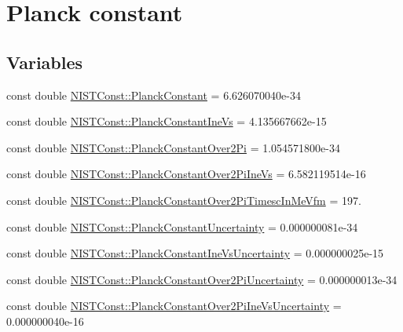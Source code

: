 \hypertarget{group___n_i_s_t_const-_planck_constant}{}\section{Planck constant}
\label{group___n_i_s_t_const-_planck_constant}
\subsection*{Variables}
\begin{DoxyCompactItemize}
\item 
const double \hyperlink{group___n_i_s_t_const-_planck_constant_ga6caa482b17de2f08f423eff1a521b0d7}{N\+I\+S\+T\+Const\+::\+Planck\+Constant} = 6.\+626070040e-\/34
\item 
const double \hyperlink{group___n_i_s_t_const-_planck_constant_ga4587d736f45c35788453a9509eaee7f2}{N\+I\+S\+T\+Const\+::\+Planck\+Constant\+Ine\+Vs} = 4.\+135667662e-\/15
\item 
const double \hyperlink{group___n_i_s_t_const-_planck_constant_ga9b3484c3c80e4a97206c7945b0db539b}{N\+I\+S\+T\+Const\+::\+Planck\+Constant\+Over2\+Pi} = 1.\+054571800e-\/34
\item 
const double \hyperlink{group___n_i_s_t_const-_planck_constant_ga1d45cff7c25d4ebb0639311d5c3ea20d}{N\+I\+S\+T\+Const\+::\+Planck\+Constant\+Over2\+Pi\+Ine\+Vs} = 6.\+582119514e-\/16
\item 
const double \hyperlink{group___n_i_s_t_const-_planck_constant_ga76ea84456bc32be18fa15034da108214}{N\+I\+S\+T\+Const\+::\+Planck\+Constant\+Over2\+Pi\+Timesc\+In\+Me\+Vfm} = 197.
\item 
const double \hyperlink{group___n_i_s_t_const-_planck_constant_gaf490152b8477c6ead134e42e76753f64}{N\+I\+S\+T\+Const\+::\+Planck\+Constant\+Uncertainty} = 0.\+000000081e-\/34
\item 
const double \hyperlink{group___n_i_s_t_const-_planck_constant_ga566abddd238d05d995f61aa5d8663b3c}{N\+I\+S\+T\+Const\+::\+Planck\+Constant\+Ine\+Vs\+Uncertainty} = 0.\+000000025e-\/15
\item 
const double \hyperlink{group___n_i_s_t_const-_planck_constant_ga9a87455000578edf387376117fd5bfd8}{N\+I\+S\+T\+Const\+::\+Planck\+Constant\+Over2\+Pi\+Uncertainty} = 0.\+000000013e-\/34
\item 
const double \hyperlink{group___n_i_s_t_const-_planck_constant_ga4b2be019a874ac4dab4031b849242335}{N\+I\+S\+T\+Const\+::\+Planck\+Constant\+Over2\+Pi\+Ine\+Vs\+Uncertainty} = 0.\+000000040e-\/16

\end{DoxyCompactItemize}
